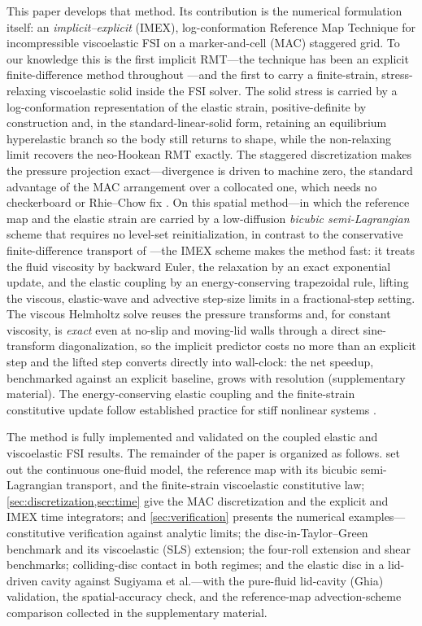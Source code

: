 \documentclass[final,3p,times]{elsarticle}
\theoremstyle{remark}
\begin{document}
This paper develops that method. Its contribution is the numerical formulation itself:
an \emph{implicit--explicit} (IMEX), log-conformation Reference Map Technique for incompressible
viscoelastic FSI on a marker-and-cell (MAC) staggered grid. To our knowledge this is the first
implicit RMT---the technique has been an explicit finite-difference method throughout
\cite{Kamrin2012,Rycroft2020,Jain2019}---and the first to carry a finite-strain, stress-relaxing
viscoelastic solid inside the FSI solver.
The solid stress
is carried by a log-conformation representation of the elastic strain, positive-definite by
construction and, in the standard-linear-solid form, retaining an equilibrium
hyperelastic branch so the body still returns to shape, while the non-relaxing limit
recovers the neo-Hookean RMT exactly. The staggered discretization makes the pressure
projection exact---divergence is driven to machine zero, the standard advantage of the MAC
arrangement over a collocated one, which needs no checkerboard or Rhie--Chow fix
\cite{Harlow1965,Chorin1968,Brown2001}. On this spatial method---in which
the reference map and the elastic strain are carried by a low-diffusion \emph{bicubic
semi-Lagrangian} scheme that requires no level-set reinitialization, in contrast to the
conservative finite-difference transport of \cite{Jain2019}---the IMEX scheme makes the method
fast: it treats the fluid viscosity by backward Euler, the relaxation by an exact exponential
update, and the elastic coupling by an energy-conserving trapezoidal rule, lifting the viscous,
elastic-wave and advective step-size limits in a fractional-step setting. The viscous Helmholtz
solve reuses the pressure transforms and, for constant viscosity, is \emph{exact} even at no-slip
and moving-lid walls through a direct sine-transform diagonalization, so the implicit predictor
costs no more than an explicit step and the lifted step converts directly into wall-clock: the
net speedup, benchmarked against an explicit baseline, grows with resolution (supplementary
material). The energy-conserving elastic coupling and the finite-strain constitutive update
follow established practice for stiff nonlinear systems \cite{Ascher1997,Reese1998,Simo1998}.

The method is fully implemented and validated on the coupled elastic and viscoelastic
FSI results. The remainder of the paper is organized as follows.
 set out the continuous one-fluid model,
the reference map with its bicubic semi-Lagrangian transport, and the finite-strain
viscoelastic constitutive law;
\cref{sec:discretization,sec:time} give the MAC discretization and the explicit and IMEX
time integrators;
and \cref{sec:verification} presents the numerical examples---constitutive verification
against analytic limits; the disc-in-Taylor--Green benchmark and its viscoelastic (SLS)
extension; the four-roll extension and shear benchmarks; colliding-disc contact in both
regimes; and the elastic disc in a lid-driven cavity against Sugiyama
et al.---with the pure-fluid lid-cavity
(Ghia) validation, the spatial-accuracy check, and the reference-map advection-scheme
comparison collected in the supplementary material.
\end{document}
